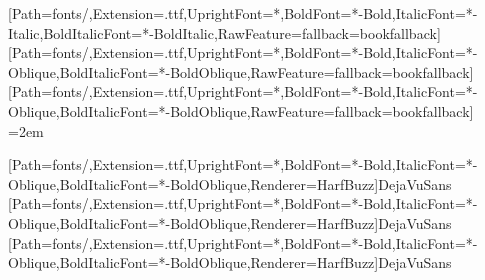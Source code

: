 \usepackage{graphicx}
\usepackage{eso-pic}
\renewcommand{\maketitle}{}
\setmainfont{DejaVuSerif}[Path=fonts/,Extension=.ttf,UprightFont=*,BoldFont=*-Bold,ItalicFont=*-Italic,BoldItalicFont=*-BoldItalic,RawFeature={fallback=bookfallback}]
\setsansfont{DejaVuSans}[Path=fonts/,Extension=.ttf,UprightFont=*,BoldFont=*-Bold,ItalicFont=*-Oblique,BoldItalicFont=*-BoldOblique,RawFeature={fallback=bookfallback}]
\setmonofont{DejaVuSansMono}[Path=fonts/,Extension=.ttf,UprightFont=*,BoldFont=*-Bold,ItalicFont=*-Oblique,BoldItalicFont=*-BoldOblique,RawFeature={fallback=bookfallback}]
\emergencystretch=2em
\usepackage{fvextra}
\usepackage{etoolbox}
\DeclareRobustCommand{\BookCodeBreak}{\allowbreak}
\usepackage[english,bidi=basic]{babel}
[Path=fonts/,Extension=.ttf,UprightFont=*,BoldFont=*-Bold,ItalicFont=*-Oblique,BoldItalicFont=*-BoldOblique,Renderer=HarfBuzz]{DejaVuSans}
[Path=fonts/,Extension=.ttf,UprightFont=*,BoldFont=*-Bold,ItalicFont=*-Oblique,BoldItalicFont=*-BoldOblique,Renderer=HarfBuzz]{DejaVuSans}
[Path=fonts/,Extension=.ttf,UprightFont=*,BoldFont=*-Bold,ItalicFont=*-Oblique,BoldItalicFont=*-BoldOblique,Renderer=HarfBuzz]{DejaVuSans}

\DeclareRobustCommand{\BookArabic}[1]{\foreignlanguage{arabic}{#1}}
\makeatletter
\renewcommand{\@pnumwidth}{3em}
\renewcommand{\@tocrmarg}{4em}
\makeatother

